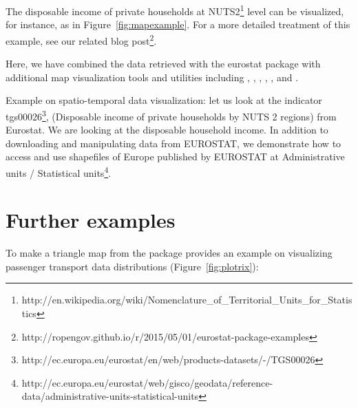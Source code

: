 The disposable income of private households at
NUTS2\footnote{http://en.wikipedia.org/wiki/Nomenclature\_of\_Territorial\_Units\_for\_Statistics}
level can be visualized, for instance, as in
Figure~\ref{fig:mapexample}. For a more detailed treatment of this
example, see our related blog
post\footnote{http://ropengov.github.io/r/2015/05/01/eurostat-package-examples}.


Here, we have combined the data retrieved with the eurostat package
with additional map visualization tools and utilities including
 \citep{grid},  \citep{maptools},  \citep{rgdal},
 \citep{rgeos},  \citep{scales}, and
 \citep{stringr}.

Example on spatio-temporal data visualization: let us look at the
indicator
tgs00026\footnote{http://ec.europa.eu/eurostat/en/web/products-datasets/-/TGS00026},
(Disposable income of private households by NUTS 2 regions) from
Eurostat. We are looking at the disposable household income. In
addition to downloading and manipulating data from EUROSTAT, we
demonstrate how to access and use shapefiles of Europe published by
EUROSTAT at Administrative units / Statistical
units\footnote{http://ec.europa.eu/eurostat/web/gisco/geodata/reference-data/administrative-units-statistical-units}.



\section{Further examples}

To make a triangle map from the  \citep{plotrix}
package provides an example on visualizing passenger transport data
distributions (Figure~\ref{fig:plotrix}):

